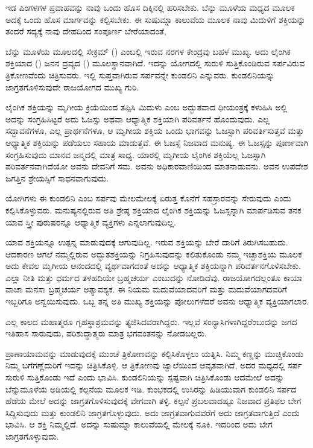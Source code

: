 ಇಡ ಪಿಂಗಳಗಳ ಪ್ರವಾಹವನ್ನು ನಾವು ಒಂದು ಹೊಸ ದಿಕ್ಕಿನಲ್ಲಿ ಹರಿಸಬೇಕು. ಬೆನ್ನು ಮೂಳೆಯ ಮಧ್ಯದ ಮೂಲಕ ಅದಕ್ಕೆ ಒಂದು ಹೊಸ ಮಾರ್ಗವನ್ನು ಕಲ್ಪಿಸಬೇಕು. ಈ ಸುಷುಮ್ನಾ ಕಾಲುವೆಯ ಮೂಲಕ ನಾವು ಮಿದುಳಿಗೆ ಶಕ್ತಿಯನ್ನು ತಂದರೆ ಸದ್ಯಕ್ಕೆ ನಾವು ದೇಹದಿಂದ ಸಂಪೂರ್ಣ ಬೇರೆಯಾದಂತೆ,

ಬೆನ್ನು ಮೂಳೆಯ ಮೂಲದಲ್ಲಿ ಸೇಕ್ರಮ್ () ಎಂಬಲ್ಲಿ ಇರುವ ನರಗಳ ಕೇಂದ್ರವು ಬಹಳ ಮುಖ್ಯ. ಅದು ಲೈಂಗಿಕ ಶಕ್ತಿಯಾದ () ಜನನ ದ್ರವ್ಯದ () ಮೂಲಸ್ಥಾನವಾಗಿದೆ. ಇದನ್ನು ಯೋಗದಲ್ಲಿ ಸುರುಳಿ ಸುತ್ತಿಕೊಂಡಿರುವ ಸರ್ಪವಿರುವ ತ್ರಿಕೋಣವೆಂದು ಚಿತ್ರಿಸುವರು. ಇಲ್ಲಿ ಸುಪ್ತವಾಗಿರುವ ಸರ್ಪವನ್ನೇ ಕುಂಡಲಿನಿ ಎನ್ನುವರು. ಕುಂಡಲಿನಿಯನ್ನು ಜಾಗ್ರತಗೊಳಿಸುವುದೇ ರಾಜಯೋಗದ ಮುಖ್ಯ ಗುರಿ.

ಲೈಂಗಿಕ ಶಕ್ತಿಯನ್ನು ಮೃಗೀಯ ಕ್ರಿಯೆಯಿಂದ ತಪ್ಪಿಸಿ ಮಿದುಳು ಎಂಬ ಅದ್ಭುತವಾದ ಧೀಯಂತ್ರಕ್ಕೆ ಕಳುಹಿಸಿ ಅಲ್ಲಿ ಅದನ್ನು ಸಂಗ್ರಹಿಸಿಟ್ಟರೆ ಅದು ಓಜಸ್ಸು ಅಥವಾ ಆಧ್ಯಾತ್ಮಿಕ ಶಕ್ತಿಯಾಗಿ ಪರಿವರ್ತನೆ ಹೊಂದುವುದು. ಎಲ್ಲ ಸದ್ಭಾವನೆಗಳೂ, ಎಲ್ಲ ಪ್ರಾರ್ಥನೆಗಳೂ, ಆ ಮೃಗೀಯ ಶಕ್ತಿಯ ಒಂದು ಭಾಗವನ್ನು ಓಜಸ್ಸಾಗಿ ಪರಿವರ್ತಿಸುತ್ತವೆ ಮತ್ತು ಆಧ್ಯಾತ್ಮಿಕ ಶಕ್ತಿಯನ್ನು ಪಡೆಯಲು ಸಹಾಯ ಮಾಡುತ್ತವೆ. ಈ ಓಜಸ್ಸೆ ನಿಜವಾದ ಮನುಷ್ಯ. ಈ ಓಜಸ್ಸನ್ನು ಪೂರ್ಣವಾಗಿ ಸಂಗ್ರಹಿಸುವುದು ಮಾನವ ಜನ್ಮದಲ್ಲಿ ಮಾತ್ರ ಸಾಧ್ಯ. ಯಾರಲ್ಲಿ ಮೃಗೀಯ ಲೈಂಗಿಕ ಶಕ್ತಿಯೆಲ್ಲ ಓಜಸ್ಸಾಗಿ ಪರಿವರ್ತನವಾಗಿದೆಯೋ ಅವನು ದೇವನಿಗೆ ಸಮ. ಅವನು ಅಧಿಕಾರವಾಣಿಯಿಂದ ಮಾತನಾಡುವನು. ಅವನ ಉಪದೇಶ ಜಗತ್ತಿನ ಶ್ರೇಯಸ್ಸಿಗೆ ಸಾಧನವಾಗುವುದು.

ಯೋಗಿಗಳು ಈ ಕುಂಡಲಿನಿ ಎಂಬ ಸರ್ಪವು ಮೇಲಮೇಲಕ್ಕೆ ಏರುತ್ತ ಕೊನೆಗೆ ಸಹಸ್ರಾರವನ್ನು ಸೇರುವುದು ಎಂದು ಕಲ್ಪಿಸಿಕೊಳ್ಳುವರು. ಮನುಷ್ಯನಲ್ಲಿರುವ ಅತಿ ಶ್ರೇಷ್ಠ ಶಕ್ತಿಯಾದ ಲೈಂಗಿಕ ಶಕ್ತಿಯನ್ನು ಓಜಸ್ಸನ್ನಾಗಿ ಮಾರ್ಪಡಿಸುವ ತನಕ ಯಾವ ಸ್ತ್ರೀ ಪುರುಷರನ್ನೂ ಆಧ್ಯಾತ್ಮಿಕ ವ್ಯಕ್ತಿಗಳು ಎನ್ನಲಾಗುವುದಿಲ್ಲ.

ಯಾವ ಶಕ್ತಿಯನ್ನೂ ಉತ್ಪನ್ನ ಮಾಡುವುದಕ್ಕೆ ಆಗುವುದಿಲ್ಲ. ಇರುವ ಶಕ್ತಿಯನ್ನು ಬೇರೆ ದಾರಿಗೆ ತಿರುಗಿಸಬಹುದು. ಆದಕಾರಣ ಆಗಲೆ ನಮ್ಮಲ್ಲಿರುವ ಅದ್ಭುತಶಕ್ತಿಯನ್ನು ನಿಗ್ರಹಿಸುವುದನ್ನು ಕಲಿತುಕೊಂಡು ನಮ್ಮ ಇಚ್ಛಾಶಕ್ತಿಯ ಮೂಲಕ ಅದು ಕೇವಲ ಮೃಗೀಯ ಆನಂದದಲ್ಲಿ ವ್ಯರ್ಥವಾಗದಂತೆ ಅದನ್ನು ಆಧ್ಯಾತ್ಮಿಕ ಶಕ್ತಿಯನ್ನಾಗಿ ಪರಿವರ್ತನಗೊಳಿಸಬೇಕು. ಎಲ್ಲಾ ನೀತಿ ಮತ್ತು ಧರ್ಮದ ತಳಹದಿಯೇ ಬ್ರಹ್ಮಚರ್ಯ ಎಂಬುದನ್ನು ನೋಡಿದೆವು. ರಾಜಯೋಗದಲ್ಲಂತೂ ಕಾಯಾ ವಾಚಾ ಮನಸಾ ಬ್ರಹ್ಮಚರ್ಯ ಅತ್ಯಾವಶ್ಯಕ. ಈ ನಿಯಮ ಮದುವೆಯಾದವರಿಗೆ ಮತ್ತು ಮದುವೆಯಾಗದವರಿಗೆ ಇಬ್ಬರಿಗೂ ಅನ್ವಯಿಸುವುದು. ಒಬ್ಬ ತನ್ನ ಅತಿ ಮುಖ್ಯ ಶಕ್ತಿಯನ್ನು ಪೋಲುಗಳೆದರೆ ಅವನು ಆಧ್ಯಾತ್ಮಿಕ ವ್ಯಕ್ತಿಯಾಗಲಾರ.

ಎಲ್ಲ ಕಾಲದ ಮಹಾತ್ಮರೂ ಗೃಹಸ್ಥಾಶ್ರಮವನ್ನು ತ್ಯಜಿಸಿದವರಾಗಿದ್ದರು. ಇಲ್ಲವೆ ಸಂನ್ಯಾಸಿಗಳಾಗಿದ್ದರೆಂಬುದನ್ನು ಜಗದ ಇತಿಹಾಸ ಸಾರುವುದು, ಪರಿಶುದ್ಧಾತ್ಮರು ಮಾತ್ರ ಭಗವಂತನನ್ನು ನೋಡಬಲ್ಲರು.

ಪ್ರಾಣಾಯಾಮವನ್ನು ಮಾಡುವುದಕ್ಕೆ ಮುಂಚೆ ತ್ರಿಕೋಣವನ್ನು ಕಲ್ಪಿಸಿಕೊಳ್ಳಲು ಯತ್ನಿಸಿ. ನಿಮ್ಮ ಕಣ್ಣನ್ನು ಮುಚ್ಚಿಕೊಂಡು ನಿಮ್ಮ ಬಗೆಗಣ್ಣೆದುರಿಗೆ ಇದನ್ನು ಚಿತ್ರಿಸಿಕೊಳ್ಳಿ. ಆ ತ್ರಿಕೋಣವು ಜ್ವಾಲೆಯಿಂದ ಆವೃತವಾಗಿದೆ, ಅದರ ಮಧ್ಯದಲ್ಲಿ ಸರ್ಪ ಸುರುಳಿ ಸುತ್ತಿಕೊಂಡು ಇದೆ ಎಂದು ಭಾವಿಸಿ. ಕುಂಡಲಿನಿಯನ್ನು ಸ್ಪಷ್ಟವಾಗಿ ಚಿತ್ರಿಸಿಕೊಂಡು ಆದಮೇಲೆ ಅದನ್ನು ಬೆನ್ನುಮೂಳೆಯ ಅಡಿಯಲ್ಲಿ ಕಲ್ಪನೆಯ ಮೂಲಕ ಇಡಿ. ಕುಂಭಕದಲ್ಲಿ ಉಸಿರನ್ನು ಹಿಡಿಯುವಾಗ ಕುಂಡಲಿನಿ ಸರ್ಪದ ಹೆಡೆಯ ಮೇಲೆ ಅದನ್ನು ಜಾಗ್ರತಗೊಳಿಸುವುದಕ್ಕೆ ವೇಗವಾಗಿ ತಳ್ಳಿ. ಕಲ್ಪನೆ ಪ್ರಬಲವಾದಷ್ಟೂ ನಿಜವಾದ ಪ್ರತಿಫಲ ಬೇಗ ಸಿದ್ದಿಸುವುದು ಮತ್ತು ಕುಂಡಲಿನಿ ಜಾಗ್ರತಗೊಳ್ಳುವುದು. ಅದು ಜಾಗ್ರತವಾಗುವವರೆಗೆ ಅದು ಜಾಗ್ರತವಾಗುತ್ತಿದೆ ಎಂದು ಭಾವಿಸಿ. ಆ ಶಕ್ತಿ ನಿಮ್ಮಲ್ಲಿದೆ. ಅದನ್ನು ಸುಷುಮ್ನಾ ಕಾಲುವೆಯಲ್ಲಿ ಮೇಲಕ್ಕೆ ನೂಕಿ. ಇದರಿಂದ ಅದು ಬೇಗ ಜಾಗ್ರತಗೊಳ್ಳುವುದು.

